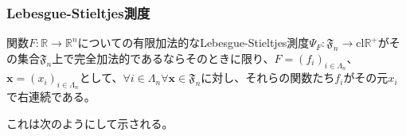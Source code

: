 \documentclass[dvipdfmx]{jsarticle}
\begin{document}
\subsubsection{Lebesgue-Stieltjes測度}%
\begin{thm}\label{4.5.4.5}
関数$F:\mathbb{R} \rightarrow \mathbb{R}^{n}$についての有限加法的なLebesgue-Stieltjes測度$\varPsi_{F}:\mathfrak{F}_{n} \rightarrow \mathrm{cl}\mathbb{R}^{+}$がその集合$\mathfrak{F}_{n}$上で完全加法的であるならそのときに限り、$F = \left( f_{i} \right)_{i \in \varLambda_{n}}$、$\mathbf{x} = \left( x_{i} \right)_{i \in \varLambda_{n}}$として、$\forall i \in \varLambda_{n}\forall\mathbf{x} \in \mathfrak{F}_{n}$に対し、それらの関数たち$f_{i}$がその元$x_{i}$で右連続である。
\end{thm}\par
これは次のようにして示される。
\end{document}
